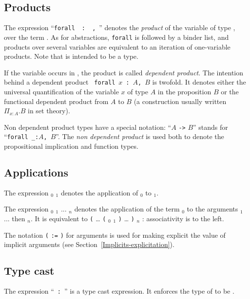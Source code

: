 \subsection{Products
\label{products}
}

The expression ``{\tt forall}~{\ident}~{\tt :}~{\type}{\tt
,}~{\term}'' denotes the {\em product} of the variable {\ident} of
type {\type}, over the term {\term}. As for abstractions, {\tt forall}
is followed by a binder list, and products over several variables are
equivalent to an iteration of one-variable products. 
Note that {\term} is intended to be a type.

If the variable {\ident} occurs in {\term}, the product is called {\em
dependent product}.  The intention behind a dependent product {\tt
forall}~$x$~{\tt :}~{$A$}{\tt ,}~{$B$} is twofold. It denotes either
the universal quantification of the variable $x$ of type $A$ in the
proposition $B$ or the functional dependent product from $A$ to $B$ (a
construction usually written $\Pi_{x:A}.B$ in set theory).

Non dependent product types have a special notation: ``$A$ {\tt ->}
$B$'' stands for ``{\tt forall \_:}$A${\tt ,}~$B$''. The {\em non dependent
product} is used both to denote the propositional implication and
function types.

\subsection{Applications
\label{applications}
}

The expression \term$_0$ \term$_1$ denotes the application of
\term$_0$ to \term$_1$.

The expression {\tt }\term$_0$ \term$_1$ ...  \term$_n${\tt}
denotes the application of the term \term$_0$ to the arguments
\term$_1$ ... then \term$_n$.  It is equivalent to {\tt (} {\ldots}
{\tt (} {\term$_0$} {\term$_1$} {\tt )} {\ldots} {\tt )} {\term$_n$} {\tt }:
associativity is to the left.

The notation {\tt (}\,{\ident}\,{\tt :=}\,{\term}\,{\tt )} for
arguments is used for making explicit the value of implicit arguments
(see Section~\ref{Implicits-explicitation}).

\subsection{Type cast
\label{typecast}
}

The expression ``{\term}~{\tt :}~{\type}'' is a type cast
expression. It enforces the type of {\term} to be {\type}.

